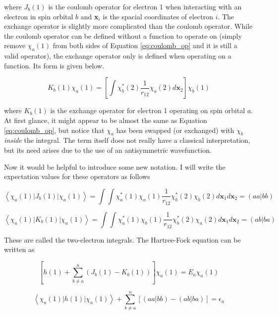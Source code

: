 \documentclass[12pt]{report}
\begin{document}
where $J_{b}(1)$ is the coulomb operator for electron 1 when interacting with an electron in spin orbital $b$ and \textbf{x}$_{i}$ is the spacial coordinates of electron $i$. The exchange operator is slightly more complicated than the coulomb operator. While the coulomb operator can be defined without a function to operate on (simply remove $\chi_{a}(1)$ from both sides of Equation \ref{eq:coulomb_op} and it is still a valid operator), the exchange operator only is defined when operating on a function. Its form is given below.

\begin{equation}
\label{eq:exchange_op}
K_{b}(1)\chi_{a}(1)=\left[\int\chi^{*}_{b}(2)\frac{1}{r_{12}}\chi_{a}(2)d\textbf{x}_{2}\right]\chi_{b}(1)
\end{equation} 

where $K_{b}(1)$ is the exchange operator for electron 1 operating on spin orbital $a$. At first glance, it might appear to be almost the same as Equation \ref{eq:coulomb_op}, but notice that $\chi_{a}$ has been swapped (or exchanged) with $\chi_{b}$ \textit{inside} the integral. The term itself does not really have a classical interpretation, but its need arises due to the use of an antisymmetric wavefunction.

Now it would be helpful to introduce some new notation. I will write the expectation values for these operators as follows

\begin{equation}
\label{eq:coulomb_op_ex}
\left<\chi_{a}(1)|J_{b}(1)|\chi_{a}(1)\right>=\int\int\chi^{*}_{a}(1)\chi_{a}(1)\frac{1}{r_{12}}\chi^{*}_{b}(2)\chi_{b}(2)d\textbf{x}_{1}d\textbf{x}_{2}
=\left(aa|bb\right)
\end{equation} 

\begin{equation}
\label{eq:exchange_op_ex}
\left<\chi_{a}(1)|K_{b}(1)|\chi_{a}(1)\right>=\int\int\chi^{*}_{a}(1)\chi_{b}(1)\frac{1}{r_{12}}\chi^{*}_{b}(2)\chi_{a}(2)d\textbf{x}_{1}d\textbf{x}_{2}
=\left(ab|ba\right)
\end{equation}

These are called the two-electron integrals. The Hartree-Fock equation can be written as 

 \begin{equation}
\label{eq:hartree-fock_eq}
\left[h(1) + \sum^{n}_{b\neq a}\left(J_{b}(1)- K_{b}(1)\right)\right]\chi_{a}(1) = E_{a}\chi_{a}(1)
\end{equation}

 \begin{equation}
\label{eq:hartree-fock_eq}
\left<\chi_{a}(1)|h(1)|\chi_{a}(1)\right> + \sum^{n}_{b\neq a}\left[\left(aa|bb\right) - \left(ab|ba\right)\right] = \epsilon_{a}
\end{equation}
\end{document}

